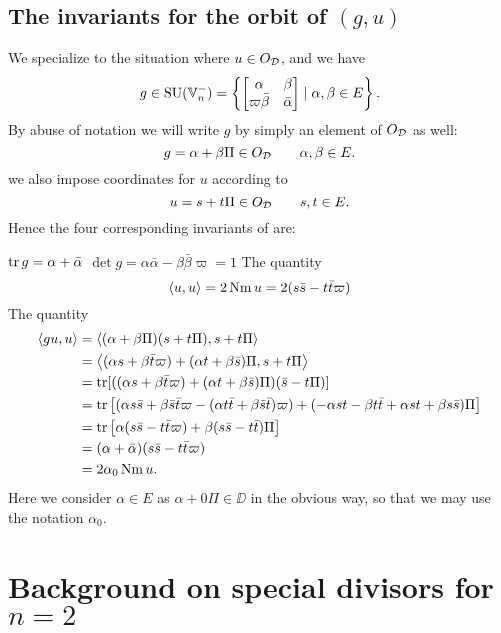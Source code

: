 \subsection{The invariants for the orbit of $(g,u)$}
We specialize to the situation where $u \in O_\mathcal D$, and we have
\[ g \in \operatorname{SU}(\mathbb V_n^-) = \left\{
    \begin{bmatrix} \alpha & \beta \\ \varpi\bar\beta & \bar\alpha \end{bmatrix}
    \mid \alpha, \beta \in E \right\}. \]
By abuse of notation we will write $g$ by simply an element of $O_\mathcal D$ as well:
\[ g = \alpha + \beta \Pi \in O_\mathcal D \qquad \alpha, \beta \in E. \]
we also impose coordinates for $u$ according to
\[ u = s + t \Pi \in O_\mathcal D \qquad s, t \in E. \]
Hence the four corresponding invariants of  are:
\begin{itemize}
  \ii $\operatorname{tr} g = \alpha + \bar\alpha$
  \ii $\det g = \alpha \bar \alpha - \beta \bar\beta \varpi = 1$
  \ii The quantity
  \[ \left\langle u,u \right\rangle = 2 \operatorname{Nm} u = 2(s \bar s - t \bar t \varpi) \]
  \ii The quantity
  \begin{align*}
    \left\langle gu, u \right\rangle
    &= \left\langle (\alpha + \beta \Pi)(s + t \Pi), s + t \Pi \right\rangle \\
    &= \left\langle (\alpha s + \beta \bar t \varpi) + (\alpha t + \beta \bar s) \Pi,
      s + t \Pi \right\rangle \\
    &= \operatorname{tr} [((\alpha s + \beta \bar t \varpi) + (\alpha t + \beta \bar s) \Pi) (\bar s - t \Pi)] \\
    &= \operatorname{tr}\left[
      (\alpha s \bar s + \beta \bar s \bar t \varpi
      - (\alpha t \bar t + \beta \bar s \bar t) \varpi)
      + (-\alpha s t - \beta t \bar t + \alpha s t + \beta s \bar s) \Pi
    \right] \\
    &= \operatorname{tr}\left[
      \alpha (s \bar s - t \bar t \varpi)
      + \beta(s \bar s - t \bar t) \Pi
    \right] \\
    &= (\alpha + \bar\alpha) (s \bar s - t \bar t \varpi) \\
    &= 2\alpha_0 \operatorname{Nm} u.
  \end{align*}
  Here we consider $\alpha \in E$ as $\alpha + 0 \Pi \in \DD$ in the obvious way,
  so that we may use the notation $\alpha_0$.
\end{itemize}
\section{Background on special divisors for $n = 2$}
